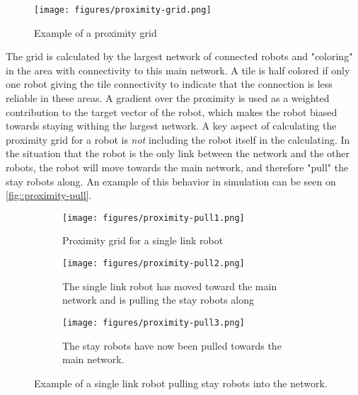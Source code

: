 \begin{figure}[h]
    \begin{center}
        \texttt{[image: figures/proximity-grid.png]}
    \end{center}
    \caption{Example of a proximity grid}\label{fig:proximity-grid}
\end{figure}

The grid is calculated by the largest network of connected robots and "coloring" in the area with connectivity to this main network. A tile is half colored if only one robot giving the tile connectivity to indicate that the connection is less reliable in these areas. A {\color{red} gradient} over the proximity is used as a weighted contribution to the target vector of the robot, which makes the robot biased towards staying withing the largest network. A key aspect of calculating the proximity grid for a robot is \emph{not} including the robot itself in the calculating. In the situation that the robot is the only link between the network and the other robots, the robot will move towards the main network, and therefore "pull" the stay robots along. An example of this behavior in simulation can be seen on \cref{fig::proximity-pull}.

\begin{figure}[h]
    \begin{center}
        \begin{subfigure}[b]{0.31\textwidth}
            \centering
            \texttt{[image: figures/proximity-pull1.png]}
            \caption{Proximity grid for a {\color{red} single link} robot}
            \label{fig:proximity-pull1}
        \end{subfigure}
        \begin{subfigure}[b]{0.31\textwidth}
            \centering
            \texttt{[image: figures/proximity-pull2.png]}
            \caption{The single link robot has moved toward the main network and is pulling the stay robots along}
            \label{fig:proximity-pull2}
        \end{subfigure}
        \begin{subfigure}[b]{0.31\textwidth}
            \centering
            \texttt{[image: figures/proximity-pull3.png]}
            \caption{The stay robots have now been pulled towards the main network.}
            \label{fig:proximity-pull3}
        \end{subfigure}
    \end{center}
    \caption{Example of a {\color{red} single link} robot pulling stay robots into the network.}\label{fig:proximity-pull}
\end{figure}



